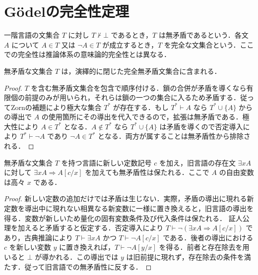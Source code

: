 \section{Gödelの完全性定理}
\begin{defn}[無矛盾な文集合]
一階言語の文集合 $T$ に対し $T\not\vdash\bot$ であるとき，$T$ は無矛盾であるという．各文 $A$ について $A\in T$ 又は $\neg A\in T$ が成立するとき，$T$ を完全な文集合という．ここでの完全性は推論体系の意味論的完全性とは異なる．
\end{defn}
\begin{prop}[極大無矛盾拡張]
無矛盾な文集合 $T$ は，演繹的に閉じた完全無矛盾文集合に含まれる．
\end{prop}
\begin{proof}
$T$ を含む無矛盾文集合を包含で順序付ける．鎖の合併が矛盾を導くなら有限個の前提のみが用いられ，それらは鎖の一つの集合に入るため矛盾する．従ってZornの補題により極大な集合 $T^*$ が存在する．もし $T^*\vdash A$ なら $T^*\cup\{A\}$ からの導出で $A$ の使用箇所にその導出を代入できるので，拡張は無矛盾である．極大性により $A\in T^*$ となる．$A\notin T^*$ なら $T^*\cup\{A\}$ は矛盾を導くので否定導入により $T^*\vdash\neg A$ であり $\neg A\in T^*$ となる．両方が属することは無矛盾性から排除される．
\end{proof}
\begin{prop}[Henkin定数の導入]
無矛盾な文集合 $T$ を持つ言語に新しい定数記号 $c$ を加え，旧言語の存在文 $\exists x A$ に対して $\exists x A\Rightarrow A[c/x]$ を加えても無矛盾性は保たれる．ここで $A$ の自由変数は高々 $x$ である．
\end{prop}
\begin{proof}
新しい定数の追加だけでは矛盾は生じない．実際，矛盾の導出に現れる新定数を導出中に現れない相異なる新変数に一様に置き換えると，旧言語の導出を得る．変数が新しいため量化の固有変数条件及び代入条件は保たれる．
証人公理を加えると矛盾すると仮定する．否定導入により $T\vdash\neg(\exists x A\Rightarrow A[c/x])$ であり，古典推論により $T\vdash\exists x A$ かつ $T\vdash\neg A[c/x]$ である．後者の導出における $c$ を新しい変数 $y$ に置き換えれば，$T\vdash\neg A[y/x]$ を得る．前者と存在除去を用いると $\bot$ が導かれる．この導出では $y$ は旧前提に現れず，存在除去の条件を満たす．従って旧言語での無矛盾性に反する．
\end{proof}
